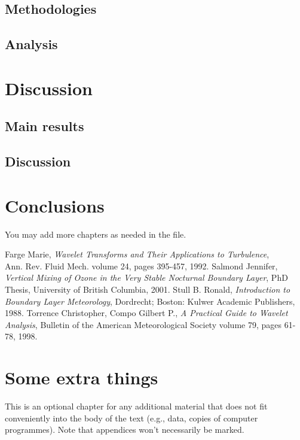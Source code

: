 \documentclass[11pt]{book}
\begin{document}
\section{Methodologies}
\section{Analysis}
\chapter{Discussion }
\section{Main results}
\section{Discussion}
\chapter{Conclusions}
You may add more chapters as needed in the file.


\renewcommand{\bibname}{References} %
\begin{thebibliography}{99} 


 Farge Marie, {\em Wavelet Transforms and Their Applications to Turbulence},  \\Ann. Rev. Fluid Mech. volume 24, pages 395-457, 1992.
  Salmond Jennifer,  {\em Vertical Mixing of Ozone in the Very Stable Nocturnal Boundary Layer}, PhD Thesis, University of British Columbia, 2001.
 Stull B. Ronald, {\em Introduction to Boundary Layer Meteorology}, Dordrecht; Boston: Kulwer Academic Publishers, 1988. %
 Torrence Christopher, Compo Gilbert P., {\em A Practical Guide to Wavelet Analysis}, Bulletin of the American Meteorological Society volume 79, pages 61-78, 1998. 
\end{thebibliography}


\appendix%
\chapter{Some extra things} 

This is an optional chapter for any additional material that does not fit 
conveniently into the body of the text (e.g., data, copies of computer programmes). 
Note that appendices won't necessarily be marked.
\end{document}
